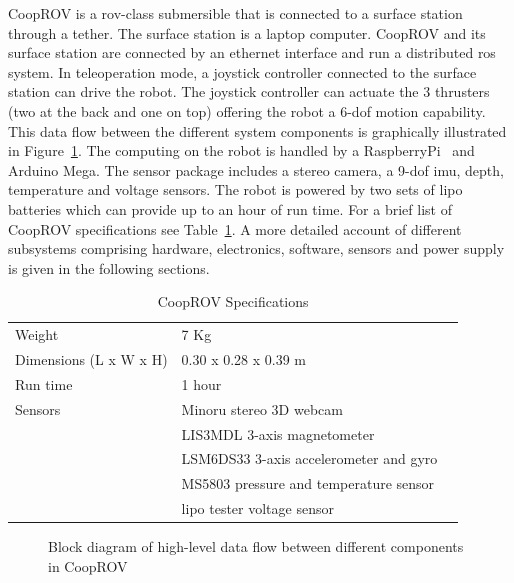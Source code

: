 \documentclass {udthesis}
\begin{document}
CoopROV is a \gls{rov}-class submersible that is connected to a surface station through a tether. The surface station is a laptop computer. CoopROV and its surface station are connected by an ethernet interface and run a distributed \gls{ros} system. In teleoperation mode, a joystick controller connected to the surface station can drive the robot. The joystick controller can actuate the 3 thrusters (two at the back and one on top) offering the robot a 6-\gls{dof} motion capability. This data flow between the different system components is graphically illustrated in Figure~\ref{fig:cooprov_dataflow}. The computing on the robot is handled by a RaspberryPi~\cite{raspberrypi} and Arduino Mega\cite{arduino}. The sensor package includes a stereo camera, a 9-\gls{dof} \gls{imu}, depth, temperature and voltage sensors. The robot is powered by two sets of \gls{lipo} batteries which can provide up to an hour of run time. For a brief list of CoopROV specifications see Table~\ref{tab:cooprov_specs}. A more detailed 
account of 
different subsystems comprising hardware, electronics, software, sensors and power supply is given in the following sections.
%
\begin{table}	
  \begin{tabular}{lll} 
  \toprule
  Weight			&7 Kg\\
  Dimensions (L x W x H)	&0.30 x 0.28 x 0.39 m\\
  Run time			&1 hour\\
  Sensors			&Minoru stereo 3D webcam \\
				&LIS3MDL 3-axis magnetometer	\\
				&LSM6DS33 3-axis accelerometer and gyro\\
				&MS5803 pressure and temperature sensor\\
				&\gls{lipo} tester voltage sensor\\
  \bottomrule
  \end{tabular}
  \caption{CoopROV Specifications}
  \label{tab:cooprov_specs}
\end{table}
  
\begin{figure} 
  \centering
\caption[CoopROV data-flow diagram]{Block diagram of high-level data flow between different components in CoopROV}
\label{fig:cooprov_dataflow}
\end{figure}
\end{document}
